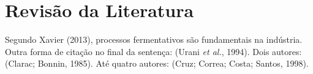 %

\section{Revisão da Literatura}

Segundo Xavier (2013), processos fermentativos são fundamentais na indústria.
Outra forma de citação no final da sentença: (Urani \textit{et al.}, 1994).
Dois autores: (Clarac; Bonnin, 1985). Até quatro autores: (Cruz; Correa; Costa; Santos, 1998).

